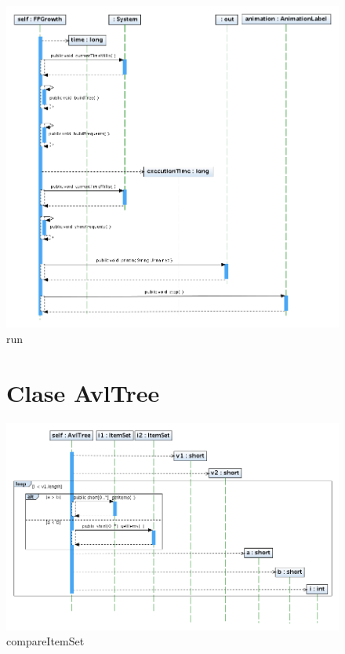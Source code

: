 \begin{figure}
\centering
\includegraphics[width=1.2\textwidth]{FPGrowth/run.png}
\caption{run}
\end{figure}
\newpage

\begin{figure}
\section{Clase AvlTree}
\includegraphics[width=1.2\textwidth]{AvlTree/compareItemSet.png}
\caption{compareItemSet}
\end{figure}
\newpage

